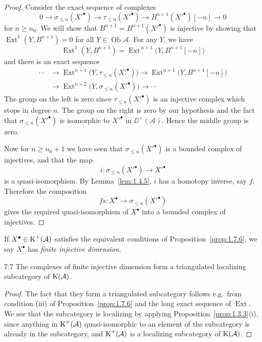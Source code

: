 \begin{proof}
Consider the exact sequence of complexes
\[
0 \to \sigma_{\le n}(X'^\bullet) \to \tau_{\le n}(X'^\bullet) \to B^{n+1}(X'^\bullet)[-n] \to 0
\]
for $n\ge n_0$. We will show that $B^{n+1}=B^{n+1}(X'^\bullet)$ is injective by
showing that $\operatorname{Ext}^1(Y,B^{n+1})=0$ for all $Y\in\operatorname{Ob}\mathcal{A}$.
For any $Y$, we have
\[
\operatorname{Ext}^1(Y,B^{n+1}) = \operatorname{Ext}^{\,n+1}\big(Y,B^{n+1}[-n]\big)
\]
and there is an exact sequence
\[
\begin{aligned}
\cdots &\to \operatorname{Ext}^{n+1}\big(Y,\tau_{\le n}(X'^\bullet)\big)
\to \operatorname{Ext}^{n+1}\big(Y,B^{n+1}[-n]\big) \\
&\to \operatorname{Ext}^{n+2}\big(Y,\sigma_{\le n}(X'^\bullet)\big) \to \cdots
\end{aligned}
\]
The group on the left is zero since $\tau_{\le n}(X'^\bullet)$ is an injective
complex which stops in degree $n$. The group on the right is zero by
our hypothesis and the fact that $\sigma_{\le n}(X'^\bullet)$ is isomorphic to
$X'^\bullet$ in $\DD^+(\mathcal{A})$. Hence the middle group is zero.

Now for $n\ge n_0+1$ we have seen that $\sigma_{\le n}(X'^\bullet)$ is a bounded
complex of injectives, and that the map
\[
i\colon \sigma_{\le n}(X'^\bullet) \to X'^\bullet
\]
is a quasi-isomorphism. By Lemma~\ref{lem:1.4.5}, $i$ has a homotopy inverse,
say $f$. Therefore the composition
\[
fs\colon X^\bullet \to \sigma_{\le n}(X'^\bullet)
\]
gives the required quasi-isomorphism of $X^\bullet$ into a bounded complex
of injectives.
\end{proof}

\begin{definition*}
If $X^\bullet\in\operatorname{K}^+(\mathcal{A})$ satisfies the equivalent conditions of Proposition~\ref{prop:1.7.6}, we say $X^\bullet$ has \emph{finite injective dimension}.
\end{definition*}

\begin{bookcorollary}{7.7}\label{cor:1.7.7}
The complexes of finite injective dimension form a triangulated localizing subcategory of $\operatorname{K}(\mathcal{A})$.
\end{bookcorollary}

\begin{proof}
The fact that they form a triangulated subcategory follows e.g.\ from condition (iii) of Proposition~\ref{prop:1.7.6} and the long exact sequence of $\operatorname{Ext}$. We see that the subcategory is localizing by applying Proposition~\ref{prop:1.3.3}(i), since anything in $\operatorname{K}^+(\mathcal{A})$ quasi-isomorphic to an element of the subcategory is already in the subcategory, and $\operatorname{K}^+(\mathcal{A})$ is a localizing subcategory of $\operatorname{K}(\mathcal{A})$.
\end{proof}

